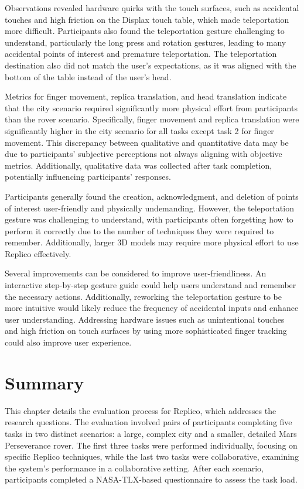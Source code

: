 \begin{itemize}
            Observations revealed hardware quirks with the touch surfaces, such as accidental touches and high friction on the Displax touch table, which made teleportation more difficult. Participants also found the teleportation gesture challenging to understand, particularly the long press and rotation gestures, leading to many accidental points of interest and premature teleportation. The teleportation destination also did not match the user's expectations, as it was aligned with the bottom of the table instead of the user's head.

            Metrics for finger movement, replica translation, and head translation indicate that the city scenario required significantly more physical effort from participants than the rover scenario. Specifically, finger movement and replica translation were significantly higher in the city scenario for all tasks except task 2 for finger movement. This discrepancy between qualitative and quantitative data may be due to participants' subjective perceptions not always aligning with objective metrics. Additionally, qualitative data was collected after task completion, potentially influencing participants' responses.

            Participants generally found the creation, acknowledgment, and deletion of points of interest user-friendly and physically undemanding. However, the teleportation gesture was challenging to understand, with participants often forgetting how to perform it correctly due to the number of techniques they were required to remember. Additionally, larger 3D models may require more physical effort to use Replico effectively.

            Several improvements can be considered to improve user-friendliness. An interactive step-by-step gesture guide could help users understand and remember the necessary actions. Additionally, reworking the teleportation gesture to be more intuitive would likely reduce the frequency of accidental inputs and enhance user understanding. Addressing hardware issues such as unintentional touches and high friction on touch surfaces by using more sophisticated finger tracking could also improve user experience.
        \end{itemize}

\section{Summary}

    This chapter details the evaluation process for Replico, which addresses the research questions. The evaluation involved pairs of participants completing five tasks in two distinct scenarios: a large, complex city and a smaller, detailed Mars Perseverance rover. The first three tasks were performed individually, focusing on specific Replico techniques, while the last two tasks were collaborative, examining the system's performance in a collaborative setting. After each scenario, participants completed a NASA-TLX-based questionnaire to assess the task load.


